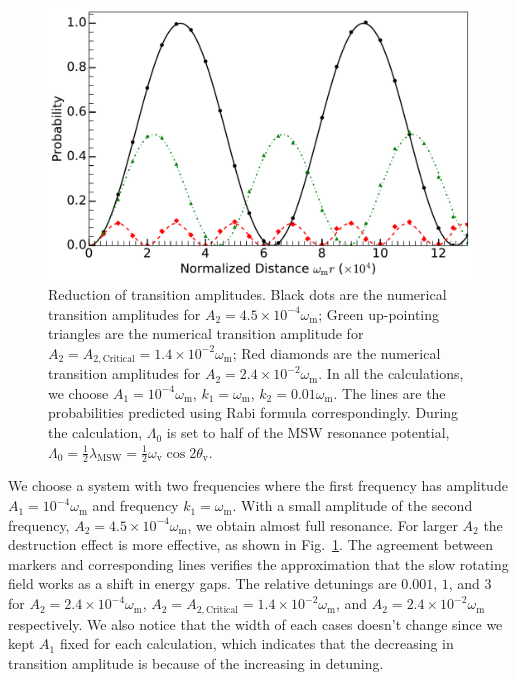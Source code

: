 \documentclass[%
reprint,
 amsmath,amssymb,
 aps,
]{revtex4-1}
\begin{document}
\begin{figure}[!htbp]
                \centering
                \includegraphics[width=\columnwidth]{assets/interference-reduction}
                \caption{Reduction of transition amplitudes. Black dots are the numerical transition amplitudes for $A_2=4.5\times 10^{-4}\omega_{\mathrm m}$; Green up-pointing triangles are the numerical transition amplitude for $A_2=A_{2,\mathrm{Critical}}=1.4\times10^{-2}\omega_{\mathrm m}$; Red diamonds are the numerical transition amplitudes for $A_2=2.4\times10^{-2}\omega_{\mathrm m}$. In all the calculations, we choose $A_1=10^{-4}\omega_{\mathrm m}$, $k_1=\omega_{\mathrm m}$, $k_2=0.01\omega_{\mathrm m}$. The lines are the probabilities predicted using Rabi formula correspondingly. During the calculation, $\Lambda_0$ is set to half of the MSW resonance potential, $\Lambda_0 = \frac{1}{2}\lambda_{\mathrm{MSW}}=\frac{1}{2}\omega_{\mathrm{v}}\cos 2\theta_{\mathrm v}$.}
                \label{fig-rabi-oscillations-energy-gap-change}
\end{figure}


We choose a system with two frequencies where the first frequency has amplitude $A_1 = 10^{-4}\omega_{\mathrm{m}}$ and frequency $k_1 = \omega_{\mathrm{m}}$. With a small amplitude of the second frequency, $A_2=4.5\times10^{-4}\omega_{\mathrm{m}}$, we obtain almost full resonance. For larger $A_2$ the destruction effect is more effective, as shown in Fig.~\ref{fig-rabi-oscillations-energy-gap-change}. The agreement between markers and corresponding lines verifies the approximation that the slow rotating field works as a shift in energy gaps. The relative detunings are $0.001$, $1$, and $3$ for $A_2= 2.4\times10^{-4}\omega_{\mathrm{m}}$, $A_2=A_{2,\text{Critical}}=1.4\times10^{-2}\omega_{\mathrm{m}}$, and $A_2= 2.4\times10^{-2} \omega_{\mathrm{m}}$ respectively. We also notice that the width of each cases doesn't change since we kept $A_1$ fixed for each calculation, which indicates that the decreasing in transition amplitude is because of the increasing in detuning.
\end{document}
